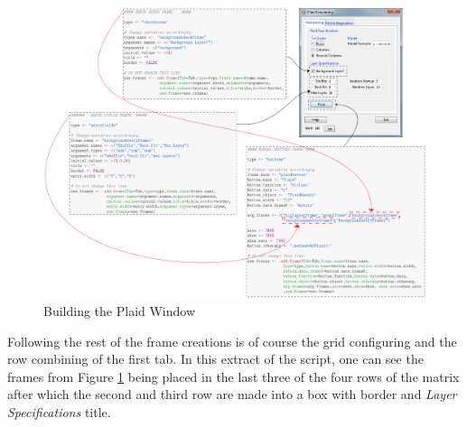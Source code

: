 \documentclass[a4paper]{article}\usepackage[]{graphicx}\usepackage[]{color}
\begin{document}
\begin{figure}[H]
\centering
\includegraphics[width=\linewidth]{figures/plaidbuilding.png}
\caption{Building the Plaid Window \label{plaidbuilding}}
\end{figure}
\noindent Following the rest of the frame creations is of course the grid
configuring and the row combining of the first tab. In this extract of the
script, one can see the frames from Figure \ref{plaidbuilding} being
placed in the last three of the four rows of the matrix after which the second
and third row are made into a box with border and {\it Layer Specifications} title.
\end{document}
